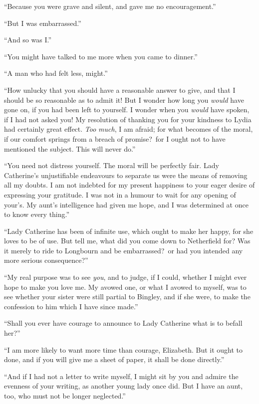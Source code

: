 \documentclass[12pt,english]{book}
\begin{document}
{}``Because you were grave and silent, and gave me no encouragement.''

{}``But I was embarrassed.''

{}``And so was I.''

{}``You might have talked to me more when you came to dinner.''

{}``A man who had felt less, might.''

{}``How unlucky that you should have a reasonable answer to give,
and that I should be so reasonable as to admit it! But I wonder how
long you \textit{would} have gone on, if you had been left to yourself.
I wonder when you \textit{would} have spoken, if I had not asked you!
My resolution of thanking you for your kindness to Lydia had certainly
great effect. \textit{Too} \textit{much}, I am afraid; for what becomes
of the moral, if our comfort springs from a breach of promise?\ for
I ought not to have mentioned the subject. This will never do.''

{}``You need not distress yourself. The moral will be perfectly fair.
Lady Catherine's unjustifiable endeavours to separate us were the
means of removing all my doubts. I am not indebted for my present
happiness to your eager desire of expressing your gratitude. I was
not in a humour to wait for any opening of your's. My aunt's intelligence
had given me hope, and I was determined at once to know every thing.''

{}``Lady Catherine has been of infinite use, which ought to make
her happy, for she loves to be of use. But tell me, what did you come
down to Netherfield for? Was it merely to ride to Longbourn and be
embarrassed?\ or had you intended any more serious consequence?''\


{}``My real purpose was to see \textit{you}, and to judge, if I could,
whether I might ever hope to make you love me. My avowed one, or what
I avowed to myself, was to see whether your sister were still partial
to Bingley, and if she were, to make the confession to him which I
have since made.''

{}``Shall you ever have courage to announce to Lady Catherine what
is to befall her?''\ 

{}``I am more likely to want more time than courage, Elizabeth. But
it ought to done, and if you will give me a sheet of paper, it shall
be done directly.''

{}``And if I had not a letter to write myself, I might sit by you
and admire the evenness of your writing, as another young lady once
did. But I have an aunt, too, who must not be longer neglected.''
\end{document}
